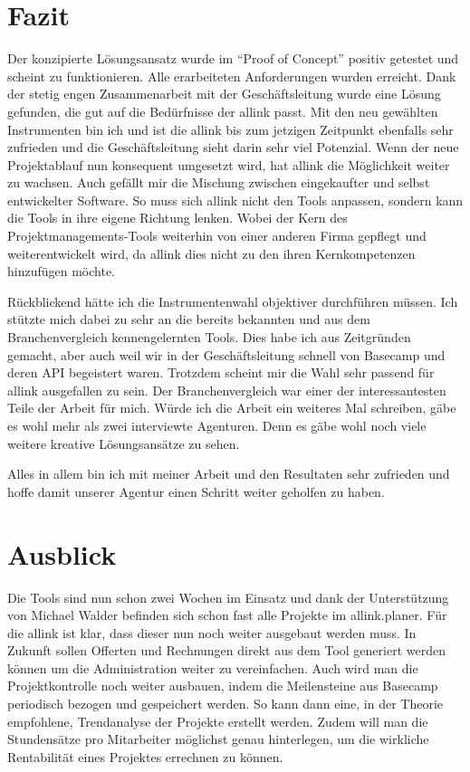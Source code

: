 \section{Fazit}
Der konzipierte Lösungsansatz wurde im ``Proof of Concept'' positiv getestet
und scheint zu funktionieren. Alle erarbeiteten Anforderungen wurden erreicht. 
Dank der stetig engen Zusammenarbeit mit der Geschäftsleitung wurde eine
Lösung gefunden, die gut auf die Bedürfnisse der allink passt. Mit den neu
gewählten Instrumenten bin ich und ist die allink bis zum jetzigen Zeitpunkt ebenfalls
sehr zufrieden und die Geschäftsleitung sieht darin sehr viel Potenzial.
Wenn der neue Projektablauf nun konsequent umgesetzt wird, hat allink die 
Möglichkeit weiter zu wachsen. Auch gefällt mir die Mischung
zwischen eingekaufter und selbst entwickelter Software. So muss sich allink
nicht den Tools anpassen, sondern kann die Tools in ihre eigene Richtung 
lenken. Wobei der Kern des Projektmanagements-Tools weiterhin von einer
anderen Firma gepflegt und weiterentwickelt wird, da allink dies nicht zu den
ihren Kernkompetenzen hinzufügen möchte.

Rückblickend hätte ich die Instrumentenwahl objektiver durchführen müssen.
Ich stützte mich dabei zu sehr an die bereits bekannten und aus dem
Branchenvergleich kennengelernten Tools. Dies habe ich aus Zeitgründen gemacht, 
aber auch weil wir in der Geschäftsleitung schnell von Basecamp und deren API 
begeistert waren. Trotzdem scheint mir die Wahl sehr passend für allink ausgefallen 
zu sein. Der Branchenvergleich war einer der interessantesten Teile der Arbeit für mich.
Würde ich die Arbeit ein weiteres Mal schreiben, gäbe es wohl mehr als
zwei interviewte Agenturen. Denn es gäbe wohl noch viele weitere kreative 
Lösungsansätze zu sehen.

Alles in allem bin ich mit meiner Arbeit und den Resultaten sehr
zufrieden und hoffe damit unserer Agentur einen Schritt weiter geholfen zu haben.

\section{Ausblick}
Die Tools sind nun schon zwei Wochen im Einsatz und dank der Unterstützung
von Michael Walder befinden sich schon fast alle Projekte im allink.planer.
Für die allink ist klar, dass dieser nun noch weiter ausgebaut werden muss.
In Zukunft sollen Offerten und Rechnungen direkt aus dem Tool generiert werden
können um die Administration weiter zu vereinfachen. Auch wird man die 
Projektkontrolle noch weiter ausbauen, indem die Meilensteine aus Basecamp
periodisch bezogen und gespeichert werden. So kann dann eine, in der Theorie 
empfohlene, Trendanalyse der Projekte erstellt werden. Zudem will man die
Stundensätze pro Mitarbeiter möglichst genau hinterlegen, um die wirkliche
Rentabilität eines Projektes errechnen zu können.

